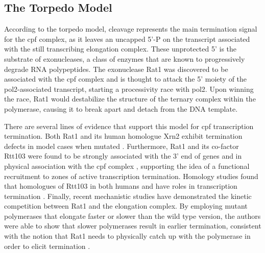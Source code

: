 \subsection{The Torpedo Model}



According to the torpedo model, cleavage represents the main termination signal for the \gls{cpf} complex, as it leaves an uncapped 5'-P on the transcript associated with the still transcribing elongation complex.
These unprotected 5' is the substrate of \FtoT{} exonucleases, a class of enzymes that are known to progressively degrade RNA polypeptides.
The \FtoT{} exonuclease Rat1 was discovered to be associated with the \gls{cpf} complex and is thought to attack the 5' moiety of the \gls{pol2}-associated transcript, starting a processivity race with \gls{pol2}.
Upon winning the race, Rat1 would destabilize the structure of the ternary complex within the polymerase, causing it to break apart and detach from the DNA template.

There are several lines of evidence that support this model for \gls{cpf} transcription termination.
Both Rat1 and its human homologue Xrn2 exhibit termination defects in model cases when mutated \citep{kim:2004:yeast, west:2004:human}.
Furthermore, Rat1 and its co-factor Rtt103 were found to be strongly associated with the 3' end of genes and in physical association with the \gls{cpf} complex \citep{kim:2004:yeast,luo:2006:role}, supporting the idea of a functional recruitment to zones of active transcription termination.
Homology studies found that homologues of Rtt103 in both humans and \cele{} have roles in transcription termination \citep{morales:2014:kub5hera, cui:2008:genes}.
Finally, recent mechanistic studies \invivo{} have demonstrated the kinetic competition between Rat1 and the elongation complex. By employing mutant polymerases that elongate faster or slower than the wild type version, the authors were able to show that slower polymerases result in earlier termination, consistent with the notion that Rat1 needs to physically catch up with the polymerase in order to elicit termination \citep{fong:2015:effects}.

